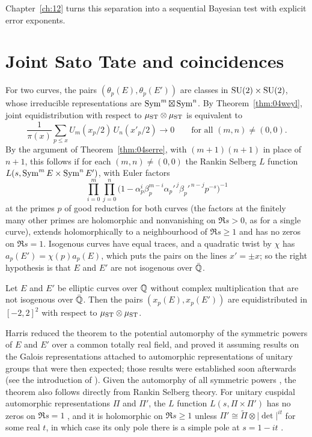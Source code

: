 Chapter~\ref{ch:12} turns this separation into a sequential Bayesian test with explicit error exponents.

\section{Joint Sato Tate and coincidences}

For two curves, the pairs $(\theta_p(E), \theta_p(E'))$ are classes in $\mathrm{SU}(2)\times\mathrm{SU}(2)$, whose irreducible representations are $\operatorname{Sym}^m\boxtimes\operatorname{Sym}^n$. By Theorem~\ref{thm:04weyl}, joint equidistribution with respect to $\mu_{\mathrm{ST}}\otimes\mu_{\mathrm{ST}}$ is equivalent to
\[
\frac{1}{\pi(x)}\sum_{p\le x}U_m(x_p/2)\,U_n(x'_p/2) \to 0 \qquad\text{for all } (m,n)\ne(0,0).
\]
By the argument of Theorem~\ref{thm:04serre}, with $(m+1)(n+1)$ in place of $n+1$, this follows if for each $(m,n)\ne(0,0)$ the Rankin Selberg $L$ function $L(s,\operatorname{Sym}^m E\times\operatorname{Sym}^n E')$, with Euler factors
\[
\prod_{i=0}^{m}\prod_{j=0}^{n}\bigl(1-\alpha_p^i\beta_p^{m-i}\alpha_p'^{\,j}\beta_p'^{\,n-j}p^{-s}\bigr)^{-1}
\]
at the primes $p$ of good reduction for both curves (the factors at the finitely many other primes are holomorphic and nonvanishing on $\Re s > 0$, as for a single curve), extends holomorphically to a neighbourhood of $\Re s\ge1$ and has no zeros on $\Re s = 1$. Isogenous curves have equal traces, and a quadratic twist by $\chi$ has $a_p(E') = \chi(p)a_p(E)$, which puts the pairs on the lines $x' = \pm x$; so the right hypothesis is that $E$ and $E'$ are not isogenous over $\bar{\mathbb{Q}}$.

\begin{theorem}\label{thm:04joint}
Let $E$ and $E'$ be elliptic curves over $\mathbb{Q}$ without complex multiplication that are not isogenous over $\bar{\mathbb{Q}}$. Then the pairs $(x_p(E), x_p(E'))$ are equidistributed in $[-2,2]^2$ with respect to $\mu_{\mathrm{ST}}\otimes\mu_{\mathrm{ST}}$.
\end{theorem}

Harris \cite{harris2009} reduced the theorem to the potential automorphy of the symmetric powers of $E$ and $E'$ over a common totally real field, and proved it assuming results on the Galois representations attached to automorphic representations of unitary groups that were then expected; those results were established soon afterwards (see the introduction of \cite{blght2011}). Given the automorphy of all symmetric powers \cite{newtonthorne2021,newtonthorne2021b}, the theorem also follows directly from Rankin Selberg theory. For unitary cuspidal automorphic representations $\Pi$ and $\Pi'$, the $L$ function $L(s,\Pi\times\Pi')$ has no zeros on $\Re s = 1$ \cite{shahidi1981}, and it is holomorphic on $\Re s \ge 1$ unless $\Pi' \cong \tilde\Pi\otimes|\det|^{it}$ for some real $t$, in which case its only pole there is a simple pole at $s = 1 - it$ \cite{jpss1983,jacquetshalika1981,moeglinwaldspurger1989}.


